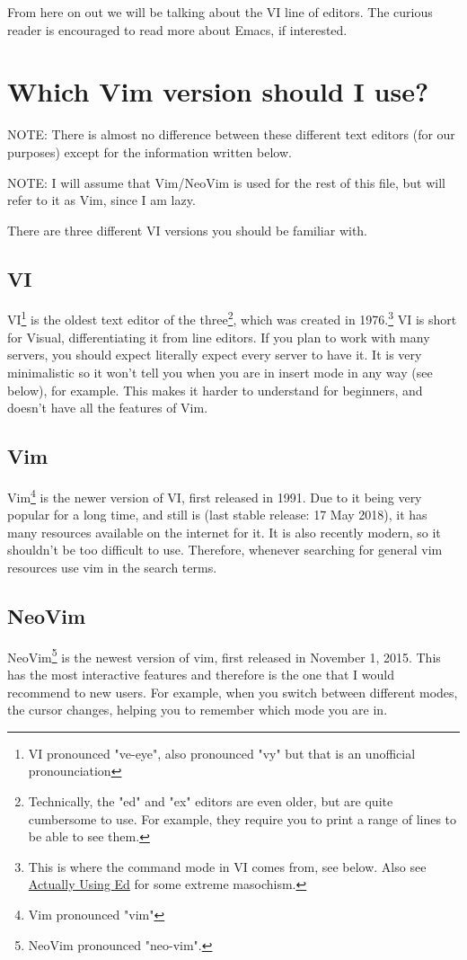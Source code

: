 \documentclass[11pt]{article}
\begin{document}
From here on out we will be talking about the VI line of editors. The curious
reader is encouraged to read more about Emacs, if interested.
\section{Which Vim version should I use?}
\label{sec:org8585ee4}
NOTE: There is almost no difference between these different text editors (for
our purposes) except for the information written below.

NOTE: I will assume that Vim/NeoVim is used for the rest of this file, but will
refer to it as Vim, since I am lazy.

There are three different VI versions you should be familiar with.
\subsection{VI}
\label{sec:org43a79ca}
VI\footnote{VI pronounced "ve-eye", also pronounced "vy" but that is an unofficial pronounciation} is the oldest text editor of the three\footnote{Technically, the "ed" and "ex" editors are even older, but are quite
cumbersome to use. For example, they require you to print a range of lines to be
able to see them.}, which was created in
1976.\footnote{This is where the command mode in VI comes from, see below. Also see
\href{https://sanctum.geek.nz/arabesque/actually-using-ed/}{Actually Using Ed} for some extreme masochism.} VI is short for Visual, differentiating it from line editors. If
you plan to work with many servers, you should expect literally expect every
server to have it. It is very minimalistic so it won't tell you when you are in
insert mode in any way (see below), for example. This makes it harder to
understand for beginners, and doesn't have all the features of Vim.
\subsection{Vim}
\label{sec:org8567d19}
Vim\footnote{Vim pronounced "vim"} is the newer version of VI, first released in 1991. Due to it being
very popular for a long time, and still is (last stable release: 17 May 2018),
it has many resources available on the internet for it. It is also recently
modern, so it shouldn't be too difficult to use. Therefore, whenever searching
for general vim resources use vim in the search terms.
\subsection{NeoVim}
\label{sec:org65a35cc}
NeoVim\footnote{NeoVim pronounced "neo-vim".} is the newest version of vim, first released in November 1, 2015.
This has the most interactive features and therefore is the one that I would
recommend to new users. For example, when you switch between different modes,
the cursor changes, helping you to remember which mode you are in.
\end{document}
